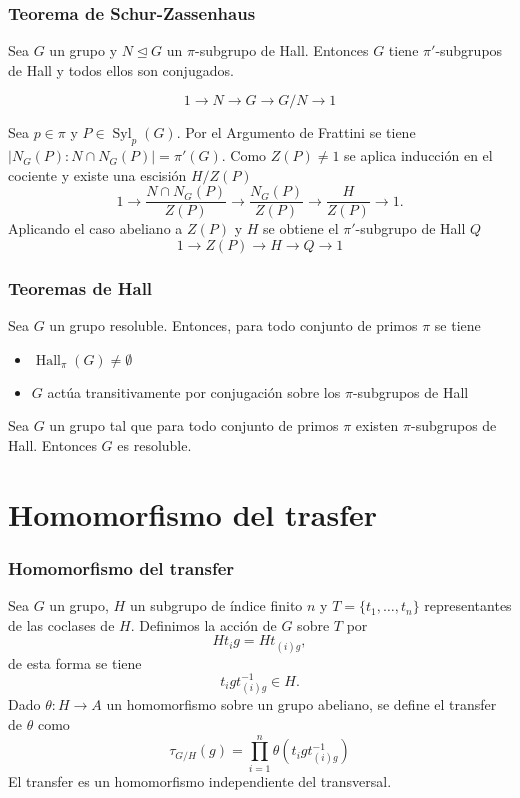 \documentclass[
	11pt, %
]{beamer}
\DeclareMathOperator{\SylowSubgroup}{Syl}
\DeclareMathOperator{\HallSubgroup}{Hall}
\newcommand{\Syl}[2]{\SylowSubgroup_{#1}(#2)}
\newcommand{\Hall}[2]{\HallSubgroup_{#1}(#2)}
\newcommand{\norm}{\trianglelefteq}
\newcommand{\ord}[1]{\left|#1\right|}%
\newcommand{\homo}[3]{#1\colon #2\to #3}
\newcommand{\extension}[5]{1\xrightarrow{} #3 \xrightarrow{#1} #4\xrightarrow{#2} #5 \xrightarrow{} 1}
\newcommand{\transversal}[2]{\{#1_1,\ldots,#1_#2\}}
\newcommand{\transfer}[2]{\tau_{#1/ #2}}
\begin{document}
\begin{frame}
	\frametitle{Teorema de Schur-Zassenhaus}
	
	\begin{theorem}
		Sea $G$ un grupo y $N\norm G$ un $\pi$-subgrupo de Hall. Entonces $G$ tiene $\pi'$-subgrupos de Hall y todos ellos son conjugados.
	\end{theorem}
	
	$$
		\extension {}{} N G {G/N}
	$$
	
	Sea $p\in \pi$ y $P\in \Syl p G$. Por el Argumento de Frattini se tiene $\ord{N_G(P):N\cap N_G(P)} = \pi'(G)$. Como $Z(P) \neq 1$ se aplica inducción en el cociente y existe una escisión $H/Z(P)$
	$$
		\extension {}{} {\frac{N\cap N_G(P)}{Z(P)}} {\frac{N_G(P)}{Z(P)}} {\frac{H}{Z(P)}}.
	$$
	Aplicando el caso abeliano a $Z(P)$ y $H$ se obtiene el $\pi'$-subgrupo de Hall $Q$
	$$
		\extension {}{} {Z(P)}{H}{Q}
	$$
\end{frame}

\begin{frame}
	\frametitle{Teoremas de Hall}
	
	\begin{theorem}
		Sea $G$ un grupo resoluble. Entonces, para todo conjunto de primos $\pi$ se tiene
		\begin{itemize}
			 \item $\Hall \pi G \neq \emptyset$
			 \item $G$ actúa transitivamente por conjugación sobre los $\pi$-subgrupos de Hall
		\end{itemize}
	\end{theorem}
	\begin{theorem}
		Sea $G$ un grupo tal que para todo conjunto de primos $\pi$ existen $\pi$-subgrupos de Hall. Entonces $G$ es resoluble.
	\end{theorem}
	
\end{frame}





\section{Homomorfismo del trasfer}

\begin{frame}
	\frametitle{Homomorfismo del transfer}
	Sea $G$ un grupo, $H$ un subgrupo de índice finito $n$ y $T = \transversal t n$ representantes de las coclases de $H$.
	Definimos la acción de $G$ sobre $T$ por
	$$
		Ht_i g = Ht_{(i)g},
	$$
	de esta forma se tiene
	$$
		t_igt_{(i)g}^{-1}\in H.
	$$
	Dado $\homo \theta H A$ un homomorfismo sobre un grupo abeliano, se define el transfer de $\theta$ como
	$$
		{\transfer G H}(g) = \prod_{i=1}^n \theta\left(t_igt_{(i)g}^{-1}\right)
	$$
	El transfer es un homomorfismo independiente del transversal.
\end{frame}
\end{document}
